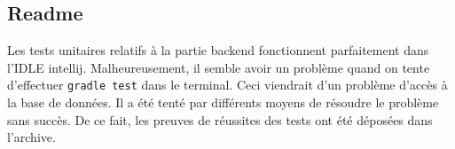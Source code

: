 \subsection{Readme}
\begin{flushleft}
Les tests unitaires relatifs à la partie backend fonctionnent parfaitement dans l'IDLE intellij. Malheureusement, il semble avoir un problème quand on tente d'effectuer \texttt{gradle test} dans le terminal. Ceci viendrait d'un problème d'accès à la base de données. Il a été tenté par différents moyens de résoudre le problème sans succès. De ce fait, les preuves de réussites des tests ont été déposées dans l'archive. 
\end{flushleft}

